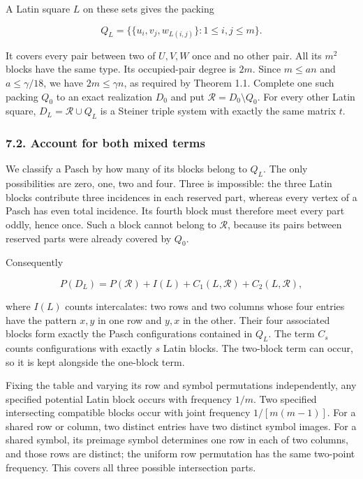 \documentclass[english,11pt,a4paper]{article}
\begin{document}
A Latin square \(L\) on these sets gives the packing

\[Q_L=\{\{u_i,v_j,w_{L(i,j)}\}:1\le i,j\le m\}.\]

It covers every pair between two of \(U,V,W\) once and no other pair. All its \(m^2\) blocks have the same type. Its occupied-pair degree is \(2m\). Since \(m\le an\) and \(a\le\gamma/18\), we have \(2m\le\gamma n\), as required by Theorem 1.1. Complete one such packing \(Q_0\) to an exact realization \(D_0\) and put \(\mathcal R=D_0\setminus Q_0\). For every other Latin square, \(D_L=\mathcal R\cup Q_L\) is a Steiner triple system with exactly the same matrix \(t\).

\subsubsection{7.2. Account for both mixed terms}\label{account-for-both-mixed-terms}

We classify a Pasch by how many of its blocks belong to \(Q_L\). The only possibilities are zero, one, two and four. Three is impossible: the three Latin blocks contribute three incidences in each reserved part, whereas every vertex of a Pasch has even total incidence. Its fourth block must therefore meet every part oddly, hence once. Such a block cannot belong to \(\mathcal R\), because its pairs between reserved parts were already covered by \(Q_0\).

Consequently

\[P(D_L)=P(\mathcal R)+I(L)+C_1(L,\mathcal R)+C_2(L,\mathcal R),\tag{7.1}\]

where \(I(L)\) counts intercalates: two rows and two columns whose four entries have the pattern \(x,y\) in one row and \(y,x\) in the other. Their four associated blocks form exactly the Pasch configurations contained in \(Q_L\). The term \(C_s\) counts configurations with exactly \(s\) Latin blocks. The two-block term can occur, so it is kept alongside the one-block term.

Fixing the table and varying its row and symbol permutations independently, any specified potential Latin block occurs with frequency \(1/m\). Two specified intersecting compatible blocks occur with joint frequency \(1/[m(m-1)]\). For a shared row or column, two distinct entries have two distinct symbol images. For a shared symbol, its preimage symbol determines one row in each of two columns, and those rows are distinct; the uniform row permutation has the same two-point frequency. This covers all three possible intersection parts.
\end{document}

